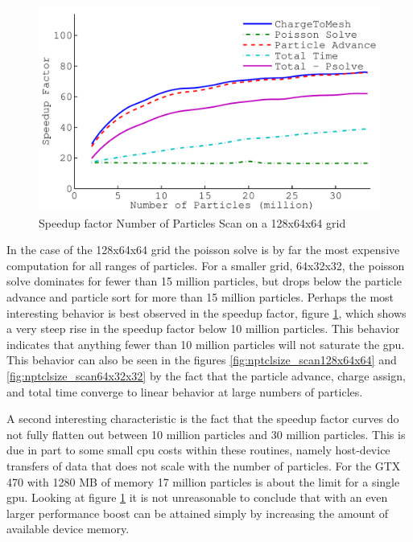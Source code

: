 \begin{figure}[h]
\begin{center}
\includegraphics[width=6in]{performance/nptclspeedup_scan128x64x64ons8bins.pdf}
\end{center}
\caption{Speedup factor Number of Particles Scan on a 128x64x64 grid}
\label{fig:nptclsize_scan_speedup}
\end{figure}

In the case of the 128x64x64 grid the poisson solve is by far the most expensive computation for all ranges of particles. For a smaller grid, 64x32x32, the poisson solve dominates for fewer than 15 million particles, but drops below the particle advance and particle sort for more than 15 million particles. Perhaps the most interesting behavior is best observed in the speedup factor, figure \ref{fig:nptclsize_scan_speedup}, which shows a very steep rise in the speedup factor below 10 million particles. This behavior indicates that anything fewer than 10 million particles will not saturate the gpu. This behavior can also be seen in the figures \ref{fig:nptclsize_scan128x64x64} and \ref{fig:nptclsize_scan64x32x32} by the fact that the particle advance, charge assign, and total time converge to linear behavior at large numbers of particles. 

A second interesting characteristic is the fact that the speedup factor curves do not fully flatten out between 10 million particles and 30 million particles. This is due in part to some small cpu costs within these routines, namely host-device transfers of data that does not scale with the number of particles. For the GTX 470 with 1280 MB of memory 17 million particles is about the limit for a single gpu. Looking at figure \ref{fig:nptclsize_scan_speedup} it is not unreasonable to conclude that with an even larger performance boost can be attained simply by increasing the amount of available device memory. \newpage

